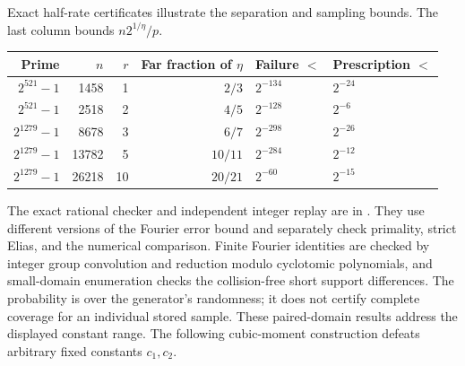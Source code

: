 Exact half-rate certificates illustrate the separation and sampling
bounds. The last column bounds $n2^{1/\eta}/p$.
\begin{center}
\begin{tabular}{@{}rrrrll@{}}
\toprule
Prime & $n$ & $r$ & Far fraction of $\eta$ & Failure $<$ & Prescription $<$\\
\midrule
$2^{521}-1$&1458&1&$2/3$&$2^{-134}$&$2^{-24}$\\
$2^{521}-1$&2518&2&$4/5$&$2^{-128}$&$2^{-6}$\\
$2^{1279}-1$&8678&3&$6/7$&$2^{-298}$&$2^{-26}$\\
$2^{1279}-1$&13782&5&$10/11$&$2^{-284}$&$2^{-12}$\\
$2^{1279}-1$&26218&10&$20/21$&$2^{-60}$&$2^{-15}$\\
\bottomrule
\end{tabular}
\end{center}
The exact rational checker and independent integer replay are in
. They use different versions of
the Fourier error bound and separately check primality, strict Elias,
and the numerical comparison. Finite Fourier identities are checked
by integer group convolution and reduction modulo cyclotomic
polynomials, and small-domain enumeration checks the collision-free
short support differences. The probability is over the generator's
randomness; it does not certify complete coverage for an individual
stored sample. These paired-domain results address the displayed
constant range. The following cubic-moment construction defeats
arbitrary fixed constants $c_1,c_2$.
